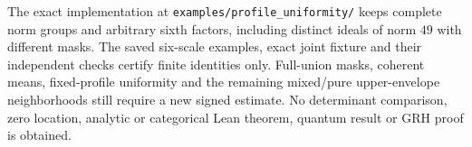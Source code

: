 The exact implementation at \texttt{examples/\allowbreak profile\_uniformity/}
keeps complete norm groups and arbitrary sixth factors, including distinct
ideals of norm $49$ with different masks. The saved six-scale examples,
exact joint fixture and their independent checks certify finite identities
only. Full-union masks, coherent means, fixed-profile uniformity and the
remaining mixed/pure upper-envelope neighborhoods still require a new
signed estimate. No determinant comparison, zero location, analytic or
categorical Lean theorem, quantum result or GRH proof is obtained.

